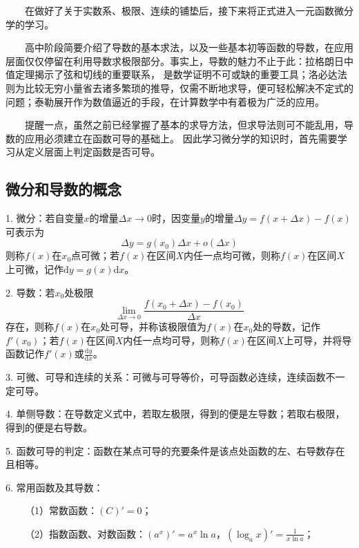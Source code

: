 \begin{tcolorbox}[colback=red!5,colframe=red!75!black]
    ~~~~在做好了关于实数系、极限、连续的铺垫后，接下来将正式进入一元函数微分学的学习。

    ~~~~高中阶段简要介绍了导数的基本求法，以及一些基本初等函数的导数，在应用层面仅仅停留在利用导数求极限部分。事实上，导数的魅力不止于此：拉格朗日中值定理揭示了弦和切线的重要联系，
    是数学证明不可或缺的重要工具；洛必达法则为比较无穷小量省去诸多繁琐的推导，仅需不断地求导，便可轻松解决不定式的问题；泰勒展开作为数值逼近的手段，在计算数学中有着极为广泛的应用。    
    
    ~~~~提醒一点，虽然之前已经掌握了基本的求导方法，但求导法则可不能乱用，导数的应用必须建立在函数可导的基础上。
    因此学习微分学的知识时，首先需要学习从定义层面上判定函数是否可导。

\end{tcolorbox}

\subsection{微分和导数的概念}

1. 微分：若自变量$x$的增量$\Delta x\rightarrow 0$时，因变量$y$的增量$\Delta y =f(x+\Delta x)-f(x)$可表示为
\begin{equation*}
    \Delta y = g(x_0)\Delta x+o(\Delta x)
\end{equation*}
则称$f(x)$在$x_0$点可微；若$f(x)$在区间$X$内任一点均可微，则称$f(x)$在区间$X$上可微，记作$\mathrm{d}y=g(x)\mathrm{d}x$。

2. 导数：若$x_0$处极限
\begin{equation*}
    \lim\limits_{\Delta x \rightarrow 0}\frac{f(x_0+\Delta x)-f(x_0)}{\Delta x}
\end{equation*}
存在，则称$f(x)$在$x_0$处可导，并称该极限值为$f(x)$在$x_0$处的导数，记作$f'(x_0)$；若$f(x)$在区间$X$内任一点均可导，则称$f(x)$在区间$X$上可导，并将导函数记作$f'(x)$或$\frac{\mathrm{d}y}{\mathrm{d}x}$。

3. 可微、可导和连续的关系：可微与可导等价，可导函数必连续，连续函数不一定可导。

4. 单侧导数：在导数定义式中，若取左极限，得到的便是左导数；若取右极限，得到的便是右导数。

5. 函数可导的判定：函数在某点可导的充要条件是该点处函数的左、右导数存在且相等。

6. 常用函数及其导数：

~~~~（1）常数函数：$(C)'=0$；

~~~~（2）指数函数、对数函数：$\left(a^x\right)'=a^x \ln a$，$\left(\log_a x\right)'=\frac{1}{x\ln a}$；

